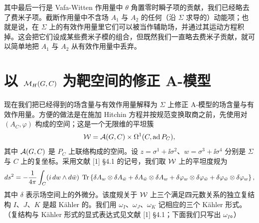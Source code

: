 其中最后一行是 Vafa-Witten 作用量中 $\theta$ 角置零时瞬子项的贡献，我们已经略去了费米子项。截断作用量中不含场 $A_1$ 与 $A_2$ 的任何（沿 $\Sigma$ 求导的）动能项；也就是说，在 $\Sigma$ 上的有效作用量里它们可以被当作辅助场，并通过其运动方程积掉。这会把它们设成某些费米子模的组合，但既然我们一直略去费米子贡献，就可以简单地把 $A_1$ 与 $A_2$ 从有效作用量中丢弃。

\section{以 \texorpdfstring{$\mathcal{M}_H(G,C)$}{MH(G,C)} 为靶空间的修正 A-模型}

现在我们把已经得到的场含量与有效作用量解释为 $\Sigma$ 上修正 A-模型的场含量与有效作用量。方便的做法是在施加 Hitchin 方程并按规范变换取商之前，先使用对 $(A_C,\varphi)$ 构成的空间；这是一个无限维的平坦簇
\[
\mathcal{W}=\mathcal{A}(G,C)\times\Omega^1(C,\mathrm{ad}\,P_C),
\]
其中 $\mathcal{A}(G,C)$ 是 $P_C$ 上联络构成的空间。设 $z=\sigma^1+\ii\sigma^2$、$w=\sigma^3+\ii\sigma^4$ 分别是 $\Sigma$ 与 $C$ 上的复坐标。采用文献 [1] §4.1 的记号，我们取 $\mathcal{W}$ 上的平坦度规为
\[
d s^2=-\frac{1}{4\pi}\int_C(i\,d w\wedge d\bar w)\;\operatorname{Tr}\left\{\delta A_w\otimes\delta A_{\bar w}+\delta A_{\bar w}\otimes\delta A_w+\delta\varphi_w\otimes\delta\varphi_{\bar w}+\delta\varphi_{\bar w}\otimes\delta\varphi_w\right\},
\]
其中 $\delta$ 表示场空间上的外微分。该度规关于 $\mathcal{W}$ 上三个满足四元数关系的独立复结构 $I$、$J$、$K$ 是超 Kähler 的。我们用 $\omega_I$、$\omega_J$、$\omega_K$ 记相应的三个 Kähler 形式。（复结构与 Kähler 形式的显式表达式见文献 [1] §4.1；下面我们只写出 $\omega_I$。）

